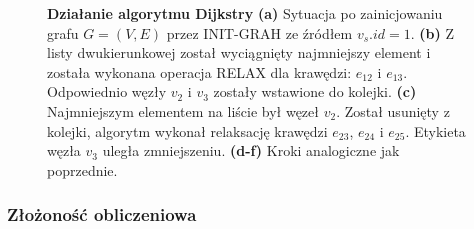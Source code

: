 \begin{figure}[!h]
\begin{subfigure}[b]{0.3\textwidth}
		\caption{}
	\end{subfigure}
	\caption{\textbf{Działanie algorytmu Dijkstry} \textbf{(a)} Sytuacja po zainicjowaniu grafu $G = \left( V, E \right)$ przez \textsf{INIT-GRAH} ze źródłem $v_{s}.id = 1$. \textbf{(b)} Z listy dwukierunkowej został wyciągnięty najmniejszy element i została wykonana operacja \textsc{RELAX} dla krawędzi: $e_{12}$ i $e_{13}$. Odpowiednio węzły $v_{2}$ i $v_{3}$ zostały wstawione do kolejki. \textbf{(c)} Najmniejszym elementem na liście był węzeł $v_{2}$. Został usunięty z kolejki, algorytm wykonał relaksację krawędzi $e_{23}$, $e_{24}$ i $e_{25}$. Etykieta węzła $v_{3}$ uległa zmniejszeniu. \textbf{(d-f)} Kroki analogiczne jak poprzednie.} \label{fig:exapleDijkstraDLList}
\end{figure}

\subsubsection{Złożoność obliczeniowa}

